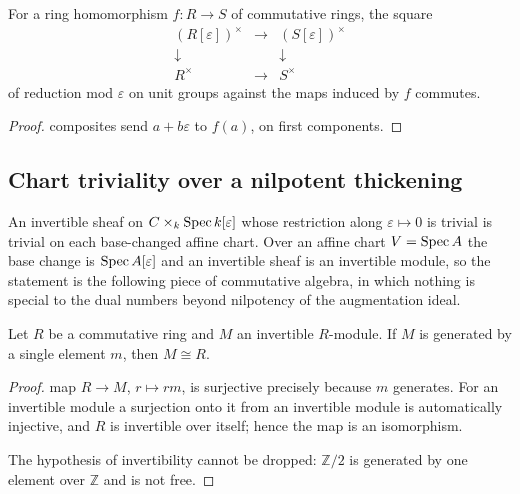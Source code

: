 \begin{lemma}\label{mk-lem:dual_number_units_fst_natural}
  \leanok

  For a ring homomorphism \(f : R \to S\) of commutative rings, the
  square
  \[
    \begin{array}{ccc}
      (R[\varepsilon])^{\times} & \longrightarrow &
        (S[\varepsilon])^{\times} \\
      \downarrow & & \downarrow \\
      R^{\times} & \longrightarrow & S^{\times}
    \end{array}
  \]
  of reduction mod \(\varepsilon\) on unit groups against the maps
  induced by \(f\) commutes.
\end{lemma}

\begin{proof}
  \leanokBoth composites send \(a + b\varepsilon\) to \(f(a)\), on first
  components.
\end{proof}

\subsection{Chart triviality over a nilpotent thickening}

An invertible sheaf on \(C \times_k \operatorname{Spec} k[\varepsilon]\) whose restriction
along \(\varepsilon \mapsto 0\) is trivial is trivial on each base-changed
affine chart. Over an affine chart \(V = \operatorname{Spec} A\) the base change is
\(\operatorname{Spec} A[\varepsilon]\) and an invertible sheaf is an invertible module, so
the statement is the following piece of commutative algebra, in which nothing
is special to the dual numbers beyond nilpotency of the augmentation ideal.

\begin{lemma}\label{mk-lem:invertible_cyclic_free}
  \leanok

  Let \(R\) be a commutative ring and \(M\) an invertible \(R\)-module. If
  \(M\) is generated by a single element \(m\), then \(M \cong R\).
\end{lemma}

\begin{proof}
  \leanokThe map \(R \to M\), \(r \mapsto rm\), is surjective precisely because \(m\)
  generates. For an invertible module a surjection onto it from an invertible
  module is automatically injective, and \(R\) is invertible over itself;
  hence the map is an isomorphism.

  The hypothesis of invertibility cannot be dropped: \(\mathbb{Z}/2\) is
  generated by one element over \(\mathbb{Z}\) and is not free.
\end{proof}

